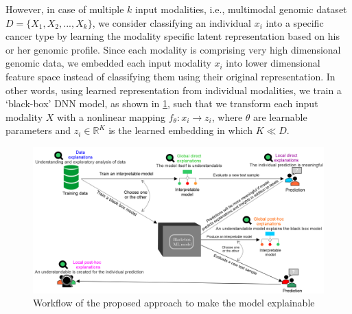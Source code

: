 \hspace*{3.5mm} However, in case of multiple $k$ input modalities, 
i.e., multimodal genomic dataset $D=\{X_1, X_2,..., X_k\}$, we  consider classifying an individual $x_i$ into a specific cancer type by learning the modality specific latent representation based on his or her genomic profile. %
Since each modality is comprising very high dimensional genomic data, we embedded each input modality $x_i$ into lower dimensional feature space instead of classifying them using their original representation. In other words, using learned representation from individual modalities, we train a `black-box' DNN model, as shown in \cref{fig:chapter_2_wf}, such that we transform each input modality $X$ with a nonlinear mapping $f_{\theta}: x_i \rightarrow z_i$, where $\theta$ are learnable parameters and $z_i \in \mathbb{R}^{K}$ is the learned embedding in which $K \ll D$. 

\begin{figure}[h]
	\centering
		\includegraphics[scale=0.6]{images/g_t_l_xai.png}
		\caption{Workflow of the proposed approach to make the model explainable}
        \label{fig:chapter_2_wf}
\end{figure}

